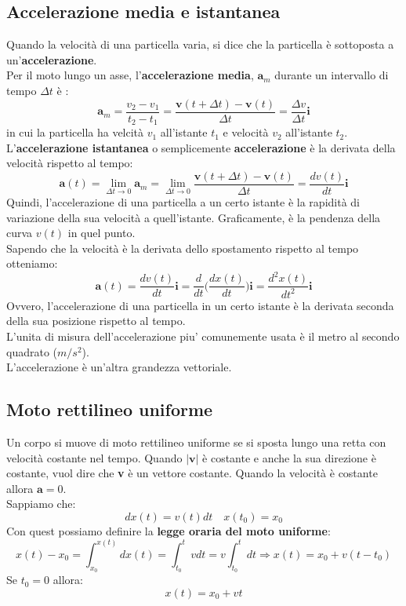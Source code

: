 \documentclass[12pt]{report}
\begin{document}
	\subsection{Accelerazione media e istantanea}
	Quando la velocità di una particella varia, si dice che la particella è  sottoposta a un'\textbf{accelerazione}. \\
	Per il moto lungo un asse, l'\textbf{accelerazione media}, $\textbf{a}_m$ durante un intervallo di tempo $\Delta t$ è :
	\[
	\textbf{a}_m = \frac{v_2 - v_1}{t_2 - t_1} = \frac{\textbf{v}(t + \Delta t) - \textbf{v}(t)}{\Delta t} = \frac{\Delta v}{\Delta t}\textbf{i}
	\]
	in cui la particella ha velcità $v_1$ all'istante $t_1$ e velocità $v_2$ all'istante $t_2$. \\
	L'\textbf{accelerazione istantanea} o semplicemente \textbf{accelerazione} è  la derivata della velocità rispetto al tempo:
	\[
	\textbf{a}(t) = \lim_{\Delta t \to 0}\textbf{a}_m = \lim_{\Delta t \to 0}\frac{\textbf{v}(t + \Delta t) - \textbf{v}(t)}{\Delta t} = \frac{dv(t)}{dt}\textbf{i}
	\]
	Quindi, l'accelerazione di una particella a un certo istante è  la rapidità di variazione della sua velocità a quell'istante. Graficamente, è  la pendenza della curva $v(t)$ in quel punto. \\
	Sapendo che la velocità è  la derivata dello spostamento rispetto al tempo otteniamo:
	\[
	\textbf{a}(t) = \frac{dv(t)}{dt}\textbf{i} = \frac{d}{dt}\Bigg(\frac{dx(t)}{dt}\Bigg)\textbf{i} = \frac{d^2x(t)}{dt^2}\textbf{i}
	\]
	Ovvero, l'accelerazione di una particella in un certo istante è  la derivata seconda della sua posizione rispetto al tempo. \\
	L'unita di misura dell'accelerazione piu' comunemente usata è  il metro al secondo quadrato ($m/s^2$). \\
	L'accelerazione è  un'altra grandezza vettoriale.
	\subsection{Moto rettilineo uniforme}
	Un corpo si muove di moto rettilineo uniforme se si sposta lungo una retta con velocità costante nel tempo.
	Quando $|\textbf{v}|$ è  costante e anche la sua direzione è  costante, vuol dire che \textbf{v} è  un vettore costante. Quando la velocità è  costante allora $\textbf{a} = 0$. \\
	Sappiamo che:
	\[
	dx(t) = v(t)dt \quad x(t_0) = x_0
	\]
	Con quest possiamo definire la \textbf{legge oraria del moto uniforme}:
	\[
	x(t) - x_0 = \int_{x_0}^{x(t)}dx(t) = \int_{t_0}^{t}vdt = v\int_{t_0}^{t}dt \Rightarrow x(t)=x_0 + v(t-t_0)
	\]
	Se $t_0 = 0$ allora:
	\[
	x(t) = x_0 + vt
	\]
\end{document}
